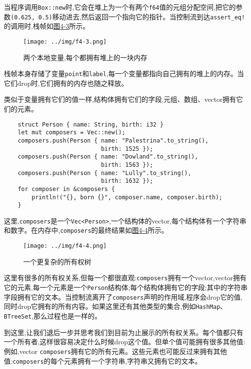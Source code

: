 当程序调用\texttt{Box::new}时,它会在堆上为一个有两个\texttt{f64}值的元组分配空间,把它的参数\texttt{(0.625, 0.5)}移动进去,然后返回一个指向它的指针。当控制流到达\texttt{assert\_eq!}的调用时,栈帧如\hyperref[f4-3]{图4-3}所示。

\begin{figure}[htbp]
    \centering
    \texttt{[image: ../img/f4-3.png]}
    \caption{两个本地变量,每个都拥有堆上的一块内存}
    \label{f4-3}
\end{figure}

栈帧本身存储了变量\texttt{point}和\texttt{label},每一个变量都指向自己拥有的堆上的内存。当它们drop时,它们拥有的内存也随之释放。

类似于变量拥有它们的值一样,结构体拥有它们的字段,元组、数组、vector拥有它们的元素。

\begin{verbatim}
    struct Person { name: String, birth: i32 }
    let mut composers = Vec::new();
    composers.push(Person { name: "Palestrina".to_string(),
                            birth: 1525 });
    composers.push(Person { name: "Dowland".to_string(),
                            birth: 1563 });
    composers.push(Person { name: "Lully".to_string(),
                            birth: 1632 });
    for composer in &composers {
        println!("{}, born {}", composer.name, composer.birth);
    }
\end{verbatim}

这里,\texttt{composers}是一个\texttt{Vec<Person>},一个结构体的vector,每个结构体有一个字符串和数字。在内存中,\texttt{composers}的最终结果如\hyperref[f4-4]{图4-4}所示。

\begin{figure}[htbp]
    \centering
    \texttt{[image: ../img/f4-4.png]}
    \caption{一个更复杂的所有权树}
    \label{f4-4}
\end{figure}

这里有很多的所有权关系,但每一个都很直观:\texttt{composers}拥有一个vector,vector拥有它的元素,每一个元素是一个\texttt{Person}结构体;每个结构体拥有它的字段;其中的字符串字段拥有它的文本。当控制流离开了\texttt{composers}声明的作用域,程序会drop它的值,同时drop它拥有的所有内容。如果这里还有其他类型的集合,例如\texttt{HashMap}、\texttt{BTreeSet},那么过程也是一样的。

到这里,让我们退后一步并思考我们到目前为止展示的所有权关系。每个值都只有一个所有者,这样很容易决定什么时候drop这个值。但单个值可能拥有很多其他值:例如,vector \texttt{composers}拥有它的所有元素。这些元素也可能反过来拥有其他值:\texttt{composers}的每个元素拥有一个字符串,字符串又拥有它的文本。

